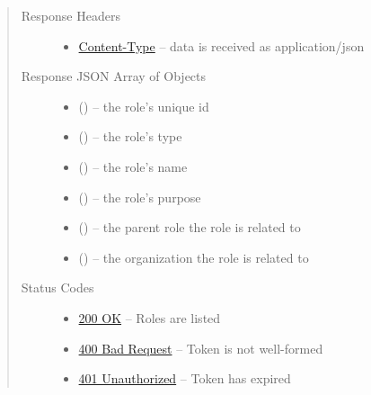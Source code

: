 \documentclass[letterpaper,10pt,english]{sphinxmanual}
\begin{document}
\begin{fulllineitems}
\begin{quote}
\begin{description}
\begin{itemize}
\end{itemize}

\item[{Response Headers}] \leavevmode\begin{itemize}
\item {} 
\href{http://tools.ietf.org/html/rfc7231\#section-3.1.1.5}{Content-Type} -- data is received as application/json

\end{itemize}

\item[{Response JSON Array of Objects}] \leavevmode\begin{itemize}
\item {} 
 () -- the role's unique id

\item {} 
 () -- the role's type

\item {} 
 () -- the role's name

\item {} 
 () -- the role's purpose

\item {} 
 () -- the parent role the role is related to

\item {} 
 () -- the organization the role is related to

\end{itemize}

\item[{Status Codes}] \leavevmode\begin{itemize}
\item {} 
\href{http://www.w3.org/Protocols/rfc2616/rfc2616-sec10.html\#sec10.2.1}{200 OK} -- Roles are listed

\item {} 
\href{http://www.w3.org/Protocols/rfc2616/rfc2616-sec10.html\#sec10.4.1}{400 Bad Request} -- Token is not well-formed

\item {} 
\href{http://www.w3.org/Protocols/rfc2616/rfc2616-sec10.html\#sec10.4.2}{401 Unauthorized} -- Token has expired


\end{itemize}
\end{description}
\end{quote}
\end{fulllineitems}
\end{document}

